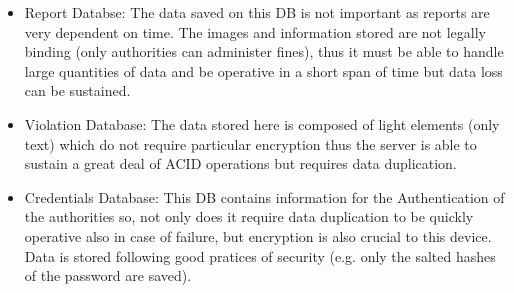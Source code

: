 \begin{itemize}

    \item  Report Databse: The data saved on this DB is not important as reports are very dependent on time. The images and information
        stored are not legally binding (only authorities can administer fines), thus it must be able to handle large quantities of data and 
        be operative in a short span of time but data loss can be sustained.

    \item Violation Database: The data stored here is composed of light elements (only text) which do not require particular encryption thus the server 
        is able to sustain a great deal of ACID operations but requires data duplication.

    \item Credentials Database: This DB contains information for the Authentication of the authorities so, not only does it require data duplication
        to be quickly operative also in case of failure, but encryption is also crucial to this device. Data is stored following good pratices of 
        security (e.g. only the salted hashes of the password are saved).     

\end{itemize}